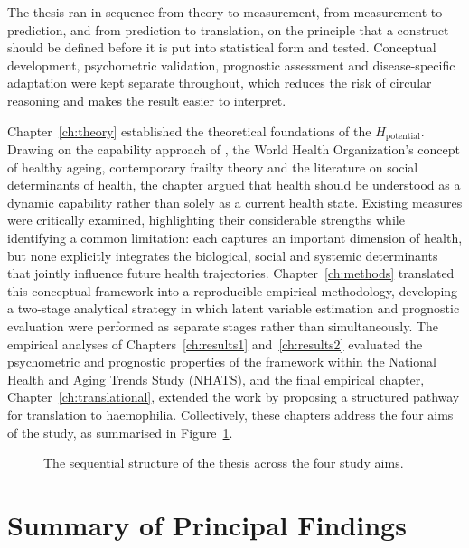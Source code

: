 The thesis ran in sequence from theory to measurement, from measurement to prediction, and from prediction to translation, on the principle that a construct should be defined before it is put into statistical form and tested. Conceptual development, psychometric validation, prognostic assessment and disease-specific adaptation were kept separate throughout, which reduces the risk of circular reasoning and makes the result easier to interpret.

Chapter~\ref{ch:theory} established the theoretical foundations of the $H_{\text{potential}}$. Drawing on the capability approach of \citet{sen_1993}, the World Health Organization's concept of healthy ageing, contemporary frailty theory and the literature on social determinants of health, the chapter argued that health should be understood as a dynamic capability rather than solely as a current health state. Existing measures were critically examined, highlighting their considerable strengths while identifying a common limitation: each captures an important dimension of health, but none explicitly integrates the biological, social and systemic determinants that jointly influence future health trajectories. Chapter~\ref{ch:methods} translated this conceptual framework into a reproducible empirical methodology, developing a two-stage analytical strategy in which latent variable estimation and prognostic evaluation were performed as separate stages rather than simultaneously. The empirical analyses of Chapters~\ref{ch:results1} and~\ref{ch:results2} evaluated the psychometric and prognostic properties of the framework within the National Health and Aging Trends Study (NHATS), and the final empirical chapter, Chapter~\ref{ch:translational}, extended the work by proposing a structured pathway for translation to haemophilia. Collectively, these chapters address the four aims of the study, as summarised in Figure~\ref{fig:contributions}.

\begin{figure}[htbp]
\centering

\captionsetup{justification=justified, width=\linewidth}
\caption{The sequential structure of the thesis across the four study aims.}
\label{fig:contributions}
\end{figure}

\section{Summary of Principal Findings}
\label{sec:disc-findings}

